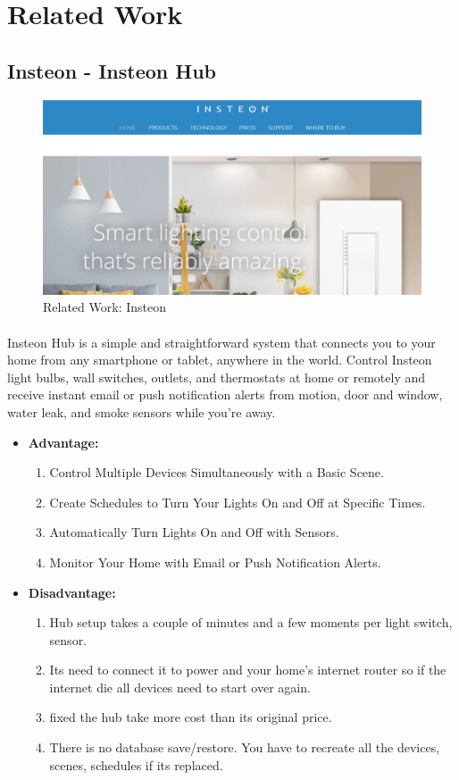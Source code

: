 \documentclass[12pt, oneside, a4paper]{book}
\newcommand\boldcolor[1]{\textcolor{bold}{\textbf{#1}}}
\begin{document}
			
		\newpage	
		\section{Related Work}
		\subsection{Insteon - Insteon Hub}
		\begin{figure}[H]
  			\caption{Related Work: Insteon}
			\includegraphics[width=\linewidth]{img/insteon.png}
		\end{figure}
		\paragraph{}Insteon Hub is a simple and straightforward system that connects you to your home from any smartphone or tablet, anywhere in the world. Control Insteon light bulbs, wall switches, outlets, and thermostats at home or remotely and receive instant email or push notification alerts from motion, door and window, water leak, and smoke sensors while you’re away\cite{insteon}.
		\begin{itemize}
		\item \boldcolor{Advantage:}
			\begin{enumerate}
				\item Control Multiple Devices Simultaneously with a Basic Scene.
				\item Create Schedules to Turn Your Lights On and Off at Specific Times.
				\item Automatically Turn Lights On and Off with Sensors.
				\item Monitor Your Home with Email or Push Notification Alerts.
			\end{enumerate}
		\item \boldcolor{Disadvantage:} 
			\begin{enumerate}
				\item Hub setup takes a couple of minutes and a few moments per light switch, sensor.
				\item Its need to connect it to power and your home's internet router so if the internet die all devices need to start over again. 
				\item fixed the hub take more cost than its original price.
				\item There is no database save/restore. You have to recreate all the devices, scenes, schedules if its replaced.
			\end{enumerate}
		\end{itemize}
		\newpage	
\end{document}
